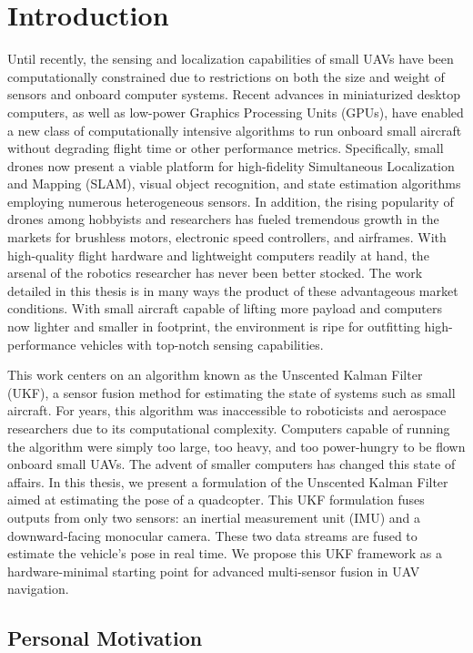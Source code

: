 \chapter{Introduction}

Until recently, the sensing and localization capabilities of small UAVs have been computationally constrained due to restrictions on both the size and weight of sensors and onboard computer systems. Recent advances in miniaturized desktop computers, as well as low-power Graphics Processing Units (GPUs), have enabled a new class of computationally intensive algorithms to run onboard small aircraft without degrading flight time or other performance metrics. Specifically, small drones now present a viable platform for high-fidelity Simultaneous Localization and Mapping (SLAM), visual object recognition, and state estimation algorithms employing numerous heterogeneous sensors. In addition, the rising popularity of drones among hobbyists and researchers has fueled tremendous growth in the markets for brushless motors, electronic speed controllers, and airframes. With high-quality flight hardware and lightweight computers readily at hand, the arsenal of the robotics researcher has never been better stocked. The work detailed in this thesis is in many ways the product of these advantageous market conditions. With small aircraft capable of lifting more payload and computers now lighter and smaller in footprint, the environment is ripe for outfitting high-performance vehicles with top-notch sensing capabilities.

This work centers on an algorithm known as the Unscented Kalman Filter (UKF), a sensor fusion method for estimating the state of systems such as small aircraft. For years, this algorithm was inaccessible to roboticists and aerospace researchers due to its computational complexity. Computers capable of running the algorithm were simply too large, too heavy, and too power-hungry to be flown onboard small UAVs. The advent of smaller computers has changed this state of affairs. In this thesis, we present a formulation of the Unscented Kalman Filter aimed at estimating the pose of a quadcopter. This UKF formulation fuses outputs from only two sensors: an inertial measurement unit (IMU) and a downward-facing monocular camera. These two data streams are fused to estimate the vehicle's pose in real time. We propose this UKF framework as a hardware-minimal starting point for advanced multi-sensor fusion in UAV navigation.

\section{Personal Motivation}

